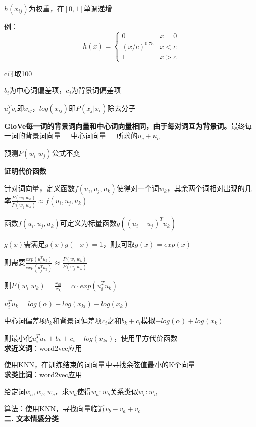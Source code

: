 \documentclass[UTF8]{ctexart}
\begin{document}
  \quad $h(x_{ij})$为权重，在$[0, 1]$单调递增

  \quad \quad 例：\begin{equation*}
    h(x) = \begin{cases}
    0 & x = 0\\
    (x / c)^{0.75} & x < c\\
    1 & x > c
    \end{cases}
  \end{equation*}

  \quad \quad c可取100

  \quad $b_i$为中心词偏差项，$c_j$为背景词偏差项

  \quad $u_j^Tv_i$即$x_{ij}$，$log(x_{ij})$即$P(x_j|x_i)$除去分子
  
  \textbf{GloVe每一词的背景词向量和中心词向量相同，由于每对词互为背景词。}最终每一词的背景词向量 = 中心词向量 = 所求的$u_c + u_o$
  
  \quad 预测$P(w_i | w_j)$公式不变
  
  \textbf{证明代价函数}
  
  \quad 针对词向量，定义函数$f(u_i, u_j, u_k)$使得对一个词$w_k$，其余两个词相对出现的几率$\frac{P(w_i | w_k)}{P(w_j | w_k)} \approx f(u_i, u_j, u_k)$
  
  \quad \quad 函数$f(u_i, u_j, u_k)$可定义为标量函数$g((u_i - u_j)^Tu_k)$
  
  \quad \quad $g(x)$需满足$g(x)g(-x) = 1$，则g可取$g(x) = exp(x)$
  
  \quad 则需要$\frac{exp(u_i^Tu_k)}{exp(u_j^Tu_k)} \approx \frac{P(w_i | w_k)}{P(w_j | w_k)}$

  \quad 则$P(w_i | w_k) = \frac{x_{ki}}{x_k} = \alpha \cdot exp(u_i^Tu_k)$

  \quad \quad $u_i^Tu_k = log(\alpha) + log(x_{ki}) - log(x_k)$

  \quad 中心词偏差项$b_k$和背景词偏差项$c_i$之和$b_k + c_i$模拟$-log(\alpha) + log(x_k)$

  \quad 则最小化$u_i^Tu_k + b_k + c_i - log(x_{ki})$，使用平方代价函数\\
\textbf{求近义词}：word2vec应用

  使用KNN，在训练结束的词向量中寻找余弦值最小的K个向量\\
\textbf{求类比词}：word2vec应用

  给定词$w_a, w_b, w_c$，求$w_d$使得$w_a : w_b$关系类似$w_c:w_d$

  算法：使用KNN，寻找向量临近$v_b - v_a + v_c$\\
\textbf{二. 文本情感分类}
\end{document}
